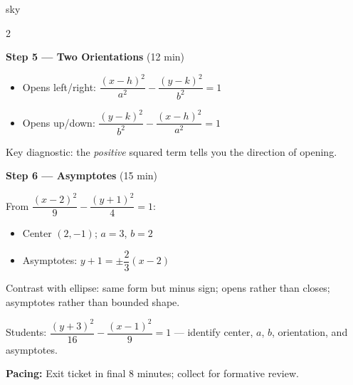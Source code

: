 \documentclass[10pt]{article}
\begin{document}
\begin{skillbox}{sky}
\begin{multicols}{2}

\textbf{Step 5 --- Two Orientations} (12 min)

\begin{itemize}[leftmargin=1.2em, itemsep=2pt]
  \item Opens left/right:
    $\dfrac{(x-h)^2}{a^2} - \dfrac{(y-k)^2}{b^2} = 1$
  \item Opens up/down:
    $\dfrac{(y-k)^2}{b^2} - \dfrac{(x-h)^2}{a^2} = 1$
\end{itemize}

Key diagnostic: the \emph{positive} squared term tells you the direction
of opening.

\columnbreak

\textbf{Step 6 --- Asymptotes} (15 min)

From $\dfrac{(x-2)^2}{9} - \dfrac{(y+1)^2}{4} = 1$:
\begin{itemize}[leftmargin=1.2em, itemsep=2pt]
  \item Center $(2,-1)$; $a = 3$, $b = 2$
  \item Asymptotes: $y + 1 = \pm\dfrac{2}{3}(x - 2)$
\end{itemize}

Contrast with ellipse: same form but minus sign; opens rather than closes;
asymptotes rather than bounded shape.

Students: $\dfrac{(y+3)^2}{16} - \dfrac{(x-1)^2}{9} = 1$ --- identify center,
$a$, $b$, orientation, and asymptotes.

\end{multicols}

\smallskip
\textbf{Pacing:} Exit ticket in final 8 minutes; collect for formative review.
\end{skillbox}

\vspace{0.08in}
\end{document}
